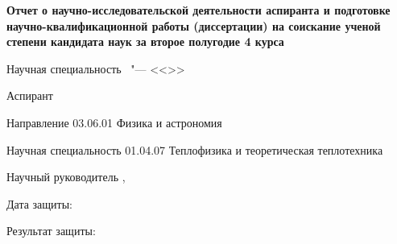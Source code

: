 \thispagestyle{empty}
\begin{center}
\thesisOrganization
\end{center}
%
\vspace{0pt plus4fill} %
\begin{center}
\textbf {\large Отчет о научно-исследовательской деятельности аспиранта и подготовке научно-квалификационной работы
(диссертации) на соискание ученой степени кандидата наук за второе полугодие 4 курса}
\end{center}
%
\begin{center}
{\large %
\thesisTitle}

\vspace{0pt plus2fill} %
\begin{minipage}[b]{0.5\linewidth}
    \begin{flushright}
        Научная специальность \thesisSpecialtyNumber\ "---
        <<\thesisSpecialtyTitle>>
    \end{flushright}
  \end{minipage}

\vspace{0pt plus2fill} %
\end{center}


Аспирант
\hfill
\thesisAuthor

Направление
\hfill
03.06.01 Физика и астрономия

Научная специальность
\hfill
01.04.07 Теплофизика и теоретическая теплотехника

\vskip 0.2in

Научный руководитель
\hfill
{\supervisorFioShort, \supervisorRegaliaShort}

\vskip 0.2in

Дата защиты:

\vskip 0.2in

Результат защиты:

%
\vspace{0pt plus4fill} %
{\centering\thesisCity\  \thesisYear\par}
